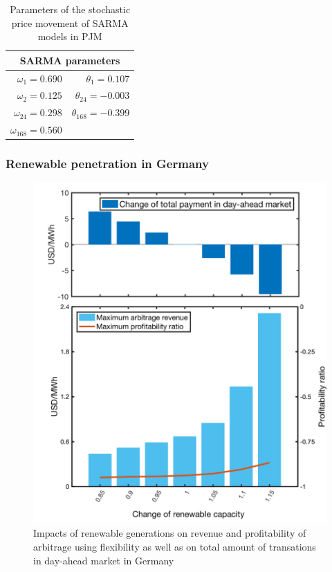 \begin{table}[h!]
	\centering
	\begin{tabular}{r r}
		\hline
		\multicolumn{2}{c}{SARMA parameters}\\
		\hline
		$\omega_1 = 0.690$ & $\theta_1 = 0.107$ \\
		$\omega_2 = 0.125$ & $\theta_{24} =-0.003$ \\
		$\omega_{24} = 0.298$ & $\theta_{168} = -0.399$ \\
		$\omega_{168} = 0.560$ & \\
		\hline
	\end{tabular}
	\caption{Parameters of the stochastic price movement of SARMA models in PJM}\label{tab:SARMA_PJM}
\end{table}


\subsubsection{Renewable penetration in Germany}


\begin{figure}[h!]
	\centering
	\includegraphics[width=0.95\linewidth]{Figures/RenewablePenetration_Germany}
	\caption{Impacts of renewable generations on revenue and profitability of arbitrage using flexibility as well as on total amount of transations in day-ahead market in Germany}
	\label{fig:renew_germany}
\end{figure}

